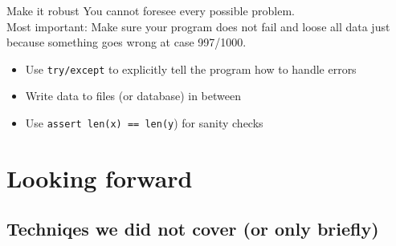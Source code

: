 \documentclass[compress]{beamer}
\begin{document}
\begin{frame}{Make it robust}
	You cannot foresee every possible problem.\\
	Most important: Make sure your program does not fail and loose all data just because something goes wrong at case 997/1000.
	\begin{itemize}
		\item Use \texttt{try/except} to explicitly tell the program how to handle errors
		\item Write data to files (or database) in between
		\item Use \texttt{assert len(x) == len(y}) for sanity checks
	\end{itemize}	
\end{frame}




\section{Looking forward}
\subsection{Techniqes we did not cover (or only briefly)}
\end{document}
